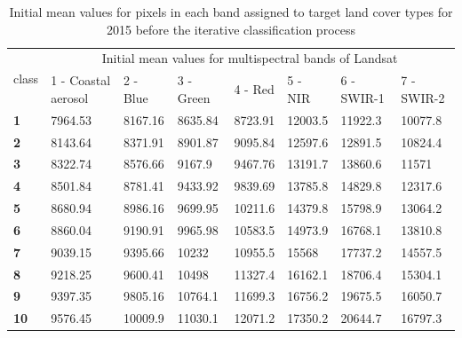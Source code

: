 \documentclass[jmse,article,submit,pdftex,moreauthors]{Definitions/mdpi}
\begin{document}
\begin{table}[H]
  \centering
  \begin{tabularx}{\textwidth}{p{0.7cm}p{2.5cm}p{1.0cm}p{1.3cm}p{1.0cm}p{1.0cm}p{1.5cm}p{1.5cm}}
  \toprule
  \multirow{2}{*}{class} & \multicolumn{7}{c}{Initial mean values for multispectral bands of Landsat} \\
     & 1 - Coastal aerosol & 2 - Blue & 3 - Green & 4 - Red & 5 - NIR & 6 - SWIR-1 & 7 - SWIR-2 \\
    \midrule
    \textbf{1} & 7964.53 & 8167.16 & 8635.84 & 8723.91 & 12003.5 & 11922.3 & 10077.8 \\
    \textbf{2} & 8143.64 & 8371.91 & 8901.87 & 9095.84 & 12597.6 & 12891.5 & 10824.4  \\
    \textbf{3} & 8322.74 & 8576.66 & 9167.9 & 9467.76 & 13191.7 & 13860.6 & 11571 \\
    \textbf{4} & 8501.84 & 8781.41 & 9433.92 & 9839.69 & 13785.8 & 14829.8 & 12317.6 \\
    \textbf{5} & 8680.94 & 8986.16 & 9699.95 & 10211.6 & 14379.8 & 15798.9 & 13064.2 \\
    \textbf{6} & 8860.04 & 9190.91 & 9965.98 & 10583.5 & 14973.9 & 16768.1 & 13810.8 \\
    \textbf{7} & 9039.15 & 9395.66 & 10232 & 10955.5 & 15568 & 17737.2 & 14557.5 \\
    \textbf{8} & 9218.25 & 9600.41 & 10498 & 11327.4 & 16162.1 & 18706.4 & 15304.1 \\
    \textbf{9} & 9397.35 & 9805.16 & 10764.1 & 11699.3 & 16756.2 & 19675.5 & 16050.7 \\
    \textbf{10} & 9576.45 & 10009.9 & 11030.1 & 12071.2 &17350.2 & 20644.7 & 16797.3 \\
\bottomrule
\end{tabularx}
  \caption{Initial mean values for pixels in each band assigned to target land cover types for 2015 before the iterative classification process}
  \label{tabA2} 
\end{table} 
\end{document}
